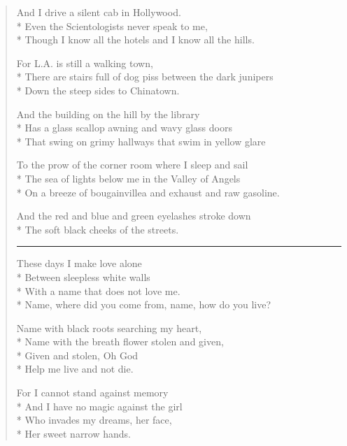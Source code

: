 \documentclass[english,11pt,letterpaper,onecolumn]{scrbook}
\begin{document}
\begin{verse}
And I drive a silent cab in Hollywood. \\*
Even the Scientologists never speak to me, \\*
Though I know all the hotels and I know all the hills.



For L.A. is still a walking town, \\*
There are stairs full of dog piss between the dark junipers  \\*
Down the steep sides to Chinatown.



And the building on the hill by the library \\*
Has a glass scallop awning and wavy glass doors \\*
That swing on grimy hallways that swim in yellow glare



To the prow of the corner room where I sleep and sail  \\*
The sea of lights below me in the Valley of Angels \\*
On a breeze of bougainvillea and exhaust and raw gasoline.



And the red and blue and green eyelashes stroke down  \\*
The soft black cheeks of the streets.


\begin{center}\rule[3pt]{2in}{0.5pt}\end{center}


These days I make love alone  \\*
Between sleepless white walls \\*
With a name that does not love me. \\*
Name, where did you come from, name, how do you live?



Name with black roots searching my heart, \\*
Name with the breath flower stolen and given, \\*
Given and stolen, Oh God \\*
Help me live and not die.



For I cannot stand against memory  \\*
And I have no magic against the girl  \\*
Who invades my dreams, her face,  \\*
Her sweet narrow hands.




\end{verse}
\end{document}

